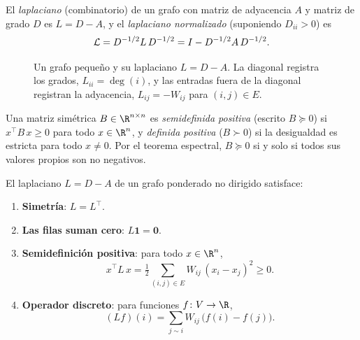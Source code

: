 \begin{definition}
\label{def:graphs:laplacian}
El \emph{laplaciano} (combinatorio) de un grafo con matriz de adyacencia $A$ y
matriz de grado $D$ es $L = D - A$, y el \emph{laplaciano normalizado} (suponiendo
$D_{ii} > 0$) es
\[
  \mathcal{L} = D^{-1/2} L\, D^{-1/2} = I - D^{-1/2} A\, D^{-1/2}.
\]
\end{definition}

\begin{figure}[h]
\centering
{}
\caption[El laplaciano del grafo]{Un grafo peque\~no y su laplaciano $L = D - A$.
La diagonal registra los grados, $L_{ii} = \deg(i)$, y las entradas fuera de la
diagonal registran la adyacencia, $L_{ij} = -W_{ij}$ para $(i,j) \in E$.}
\label{fig:graphs:laplacian}
\end{figure}

\begin{definition}
\label{def:graphs:psd}
Una matriz sim\'etrica $B \in \R^{n \times n}$ es \emph{semidefinida positiva}
(escrito $B \succeq 0$) si $x^\top B\, x \ge 0$ para todo $x \in \R^n$, y
\emph{definida positiva} ($B \succ 0$) si la desigualdad es estricta para todo
$x \neq 0$. Por el teorema espectral, $B \succeq 0$ si y solo si todos sus
valores propios son no negativos.
\end{definition}

\begin{proposition}
\label{prop:graphs:laplacian-algebra}
El laplaciano $L = D - A$ de un grafo ponderado no dirigido satisface:
\begin{enumerate}
  \item \textbf{Simetr\'ia}: $L = L^\top$.
  \item \textbf{Las filas suman cero}: $L \mathbf{1} = \mathbf{0}$.
  \item \textbf{Semidefinici\'on positiva}: para todo $x \in \R^n$,
        \[
          x^\top L\, x = \tfrac12 \sum_{(i,j) \in E} W_{ij}\,(x_i - x_j)^2 \ge 0 .
        \]
  \item \textbf{Operador discreto}: para funciones $f \colon V \to \R$,
        \[
          (L f)(i) = \sum_{j \sim i} W_{ij}\,\big(f(i) - f(j)\big).
        \]
\end{enumerate}
\end{proposition}

